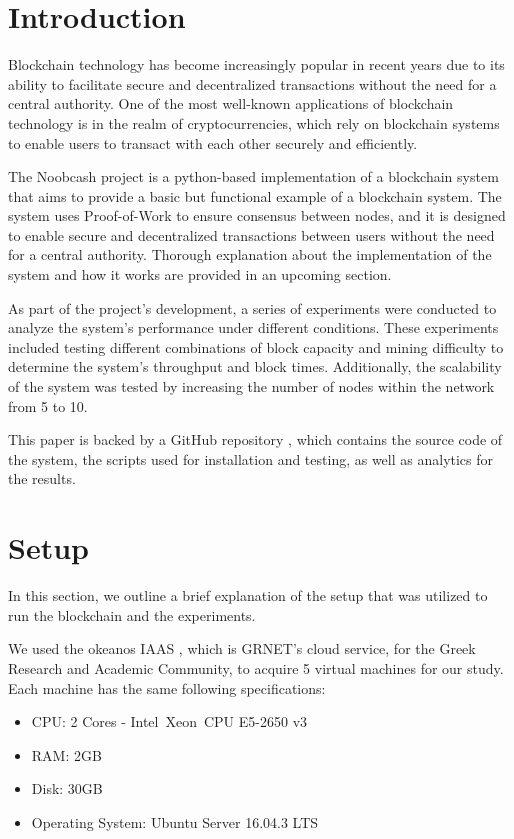 \documentclass[conference]{IEEEtran}
\begin{document}
\section{\textbf{Introduction}}
Blockchain technology has become increasingly popular in recent years due to its ability to facilitate secure and decentralized transactions without the need for a central authority. One of the most well-known applications of blockchain technology is in the realm of cryptocurrencies, which rely on blockchain systems to enable users to transact with each other securely and efficiently. 

The Noobcash project is a python-based implementation of a blockchain system that aims to provide a basic but functional example of a blockchain system. The system uses Proof-of-Work to ensure consensus between nodes, and it is designed to enable secure and decentralized transactions between users without the need for a central authority. Thorough explanation about the implementation of the system and how it works are provided in an upcoming section.

As part of the project's development, a series of experiments were conducted to analyze the system's performance under different conditions. These experiments included testing different combinations of block capacity and mining difficulty to determine the system's throughput and block times. Additionally, the scalability of the system was tested by increasing the number of nodes within the network from 5 to 10.

This paper is backed by a GitHub repository \cite{b2} \cite{b3}, which contains the source code of the system, the scripts used for installation and testing, as well as analytics for the results.

\section{\textbf{Setup}}
In this section, we outline a brief explanation of the setup that was utilized to run the blockchain and the experiments.

We used the okeanos IAAS \cite{b4}, which is GRNET's cloud service, for the Greek Research and Academic Community, to acquire 5 virtual machines for our study. Each machine has the same following specifications:

\begin{itemize}
\item CPU: 2 Cores - Intel\textregistered\ Xeon\textregistered\ CPU E5-2650 v3
\item RAM: 2GB
\item Disk: 30GB
\item Operating System: Ubuntu Server 16.04.3 LTS
\end{itemize}
\end{document}
